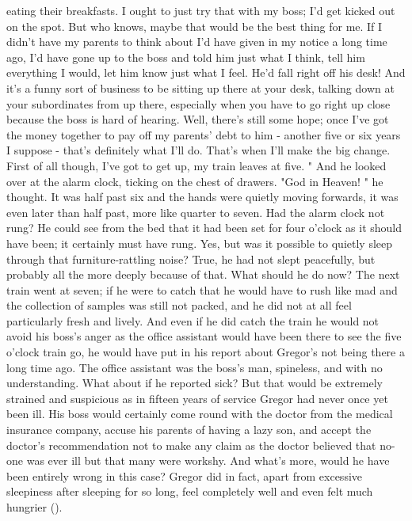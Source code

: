 \documentclass[
	listoffigures, 	%
	listoftables 	%
]{ifathesis}
\begin{document}
eating their breakfasts. I ought to just try that with my boss; I'd get kicked out on the spot. But who knows, maybe that would be the best thing for me. If I didn't have my parents to think about I'd have given in my notice a long time ago, I'd have gone up to the boss and told him just what I think, tell him everything I would, let him know just what I feel. He'd fall right off his desk! And it's a funny sort of business to be sitting up there at your desk, talking down at your subordinates from up there, especially when you have to go right up close because the boss is hard of hearing. Well, there's still some hope; once I've got the money together to pay off my parents' debt to him - another five or six years I suppose - that's definitely what I'll do. That's when I'll make the big change. First of all though, I've got to get up, my train leaves at five. " And he looked over at the alarm clock, ticking on the chest of drawers. "God in Heaven! " he thought. It was half past six and the hands were quietly moving forwards, it was even later than half past, more like quarter to seven. Had the alarm clock not rung? He could see from the bed that it had been set for four o'clock as it should have been; it certainly must have rung. Yes, but was it possible to quietly sleep through that furniture-rattling noise? True, he had not slept peacefully, but probably all the more deeply because of that. What should he do now? The next train went at seven; if he were to catch that he would have to rush like mad and the collection of samples was still not packed, and he did not at all feel particularly fresh and lively. And even if he did catch the train he would not avoid his boss's anger as the office assistant would have been there to see the five o'clock train go, he would have put in his report about Gregor's not being there a long time ago. The office assistant was the boss's man, spineless, and with no understanding. What about if he reported sick? But that would be extremely strained and suspicious as in fifteen years of service Gregor had never once yet been ill. His boss would certainly come round with the doctor from the medical insurance company, accuse his parents of having a lazy son, and accept the doctor's recommendation not to make any claim as the doctor believed that no-one was ever ill but that many were workshy. And what's more, would he have been entirely wrong in this case? Gregor did in fact, apart from excessive sleepiness after sleeping for so long, feel completely well and even felt much hungrier (\cite{frankel}).
\end{document}
